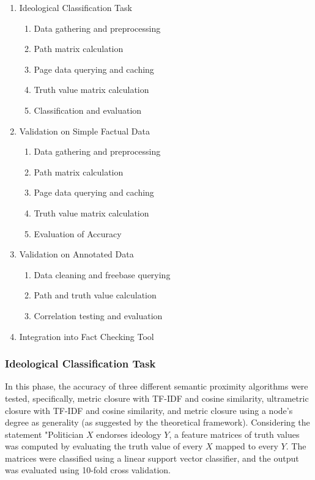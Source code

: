 \documentclass[10pt,11pt,12pt,oneside]{book}
\begin{document}
\begin{enumerate}[label*=\arabic*.]
	
	\item {Ideological Classification Task} 
	\begin{enumerate}[label*=\arabic*.]
		\item Data gathering and preprocessing
		\item Path matrix calculation
		\item Page data querying and caching
		\item Truth value matrix calculation
		\item Classification and evaluation
	\end{enumerate}

	\item {Validation on Simple Factual Data}
	\begin{enumerate}[label*=\arabic*.]
		\item Data gathering and preprocessing
		\item Path matrix calculation
		\item Page data querying and caching
		\item Truth value matrix calculation
		\item Evaluation of Accuracy
	\end{enumerate}

	\item {Validation on Annotated Data}
	\begin{enumerate}[label*=\arabic*.]
		\item Data cleaning and freebase querying
		\item Path and truth value calculation
		\item Correlation testing and evaluation
	\end{enumerate}

	\item {Integration into Fact Checking Tool}
\end{enumerate}

\subsubsection{Ideological Classification Task} 

In this phase, the accuracy of three different semantic proximity algorithms were tested, specifically, metric closure with TF-IDF and cosine similarity, ultrametric closure with TF-IDF and cosine similarity, and metric closure using a node's degree as generality (as suggested by the theoretical framework). Considering the statement "Politician $ X $ endorses ideology $ Y $, a feature matrices of truth values was computed by evaluating the truth value of every $ X $ mapped to every $ Y $. The matrices were classified using a linear support vector classifier, and the output was evaluated using 10-fold cross validation.\\
\end{document}
